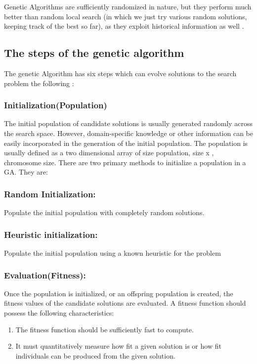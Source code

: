 Genetic Algorithms are sufficiently randomized in nature, but they perform much better than random local search (in which we just try various random solutions, keeping track of the best so far), as they exploit historical information as well \cite{GAs}.
\newpage
\subsection{The steps of the genetic algorithm}
The genetic Algorithm has six steps which can evolve solutions to the search problem the following \cite{sastry2005genetic}:
\subsubsection{Initialization(Population)}
The initial population of candidate solutions is usually generated
randomly across the search space. However, domain-specific knowledge or other
information can be easily incorporated in the generation of the initial population.
The population is usually defined as a two dimensional array of size population, size x , chromosome size.
There are two primary methods to initialize a population in a GA. They are:
\subsubsection{Random Initialization:} Populate the initial population with completely random solutions.
\subsubsection{Heuristic initialization:} Populate the initial population using a known heuristic for the problem

\subsubsection{Evaluation(Fitness):}
Once the population is initialized, or an offspring population is created, the fitness values of the candidate solutions are evaluated.
A fitness function should possess the following characteristics:
\begin{enumerate}
    \item{The fitness function should be sufficiently fast to compute.}
    \item{It must quantitatively measure how fit a given solution is or how fit individuals can be produced from the given solution.}
\end{enumerate}

